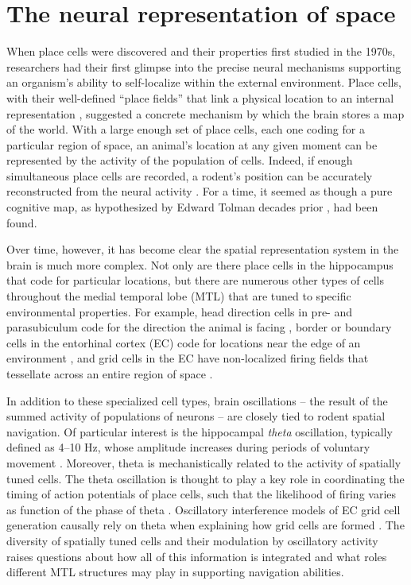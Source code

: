 \section{The neural representation of space}


When place cells were discovered and their properties first studied in the 1970s, researchers had their first glimpse into the precise neural mechanisms supporting an organism's ability to self-localize within the external environment. Place cells, with their well-defined ``place fields'' that link a physical location to an internal representation \citep{OKeeNade78}, suggested a  concrete mechanism by which the brain stores a map of the world. With a large enough set of place cells, each one coding for a particular region of space, an animal's location at any given moment can be represented by the activity of the population of cells. Indeed, if enough simultaneous place cells are recorded, a rodent's position can be accurately reconstructed from the neural activity \citep{WilsMcNa93,ZhanEtal98}. For a time, it seemed as though a pure cognitive map, as hypothesized by Edward Tolman decades prior \citep{Tolm48}, had been found.

Over time, however, it has become clear the spatial representation system in the brain is much more complex. Not only are there place cells in the hippocampus that code for particular locations, but there are numerous other types of cells throughout the medial temporal lobe (MTL) that are tuned to specific environmental properties. For example, head direction cells in pre- and parasubiculum code for the direction the animal is facing \citep{TaubEtal90}, border or boundary cells in the entorhinal cortex (EC) code for locations near the edge of an environment \citep{SolsEtal08}, and grid cells in the EC have non-localized firing fields that tessellate across an entire region of space \citep{HaftEtal05}.

In addition to these specialized cell types, brain oscillations -- the result of the summed activity of populations of neurons \citep{LachEtal03} -- are closely tied to rodent spatial navigation. Of particular interest is the hippocampal \textit{theta} oscillation, typically defined as 4--10 Hz, whose amplitude increases during periods of voluntary movement \citep{Vand69}. Moreover, theta is mechanistically related to the activity of spatially tuned cells. The theta oscillation is thought to play a key role in coordinating the timing of action potentials of place cells, such that the likelihood of firing varies as function of the phase of theta \citep{OKeeRecc93,SkagEtal96}. Oscillatory interference models of EC grid cell generation causally rely on theta when explaining how grid cells are formed \citep{BurgEtal07}. The diversity of spatially tuned cells and their modulation by oscillatory activity raises questions about how all of this information is integrated and what roles different MTL structures may play in supporting navigation abilities.

